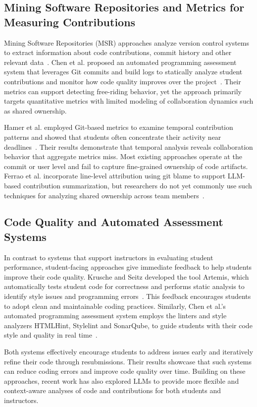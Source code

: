 \documentclass[sigconf]{acmart}
\begin{document}
\subsection{Mining Software Repositories and Metrics for Measuring Contributions}
Mining Software Repositories (MSR) approaches analyze version control systems to extract information about code contributions, commit history and other relevant data~\cite{hassan2008repomining}. Chen et al. proposed an automated programming assessment system that leverages Git commits and build logs to statically analyze student contributions and monitor how code quality improves over the project~\cite{chen2022codequality}. Their metrics can support detecting free-riding behavior, yet the approach primarily targets quantitative metrics with limited modeling of collaboration dynamics such as shared ownership.

Hamer et al. employed Git-based metrics to examine temporal contribution patterns and showed that students often concentrate their activity near deadlines~\cite{hamer2021usinggit}. Their results demonstrate that temporal analysis reveals collaboration behavior that aggregate metrics miss. Most existing approaches operate at the commit or user level and fail to capture fine-grained ownership of code artifacts. Ferrao et al. incorporate line-level attribution using git blame to support LLM-based contribution summarization, but researchers do not yet commonly use such techniques for analyzing shared ownership across team members~\cite{ferrao2025llm}.

\subsection{Code Quality and Automated Assessment Systems}
In contrast to systems that support instructors in evaluating student performance, student-facing approaches give immediate feedback to help students improve their code quality.
Krusche and Seitz developed the tool Artemis, which automatically tests student code for correctness and performs static analysis to identify style issues and programming errors~\cite{krusche2018artemis}. This feedback encourages students to adopt clean and maintainable coding practices.
Similarly, Chen et al.'s automated programming assessment system employs the linters and style analyzers HTMLHint, Stylelint and SonarQube, to guide students with their code style and quality in real time~\cite{chen2022codequality}.

Both systems effectively encourage students to address issues early and iteratively refine their code through resubmissions. Their results showcase that such systems can reduce coding errors and improve code quality over time. Building on these approaches, recent work has also explored LLMs to provide more flexible and context-aware analyses of code and contributions for both students and instructors.
\end{document}
